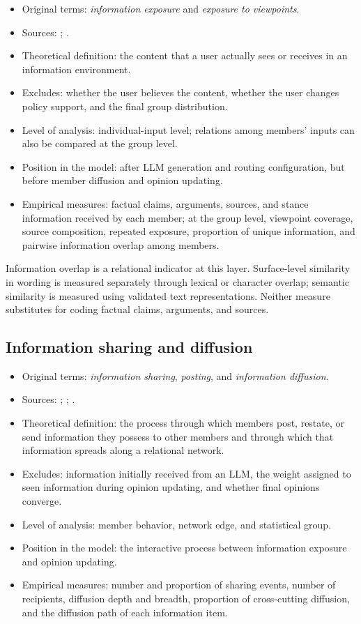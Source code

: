 \documentclass[11pt,a4paper]{article}
\newcommand{\term}[1]{\textit{#1}}
\begin{document}
\begin{itemize}
\item Original terms: \term{information exposure} and \term{exposure to viewpoints}.
\item Sources: \citet{nyhan2023}; \citet{perra2019}.
\item Theoretical definition: the content that a user actually sees or receives in an information environment.
\item Excludes: whether the user believes the content, whether the user changes policy support, and the final group distribution.
\item Level of analysis: individual-input level; relations among members' inputs can also be compared at the group level.
\item Position in the model: after LLM generation and routing configuration, but before member diffusion and opinion updating.
\item Empirical measures: factual claims, arguments, sources, and stance information received by each member; at the group level, viewpoint coverage, source composition, repeated exposure, proportion of unique information, and pairwise information overlap among members.
\end{itemize}

Information overlap is a relational indicator at this layer. Surface-level similarity in wording is measured separately through lexical or character overlap; semantic similarity is measured using validated text representations. Neither measure substitutes for coding factual claims, arguments, and sources.

\subsection{Information sharing and diffusion}

\begin{itemize}
\item Original terms: \term{information sharing}, \term{posting}, and \term{information diffusion}.
\item Sources: \citet{perra2019}; \citet{stasser1985}; \citet{steinel2010}.
\item Theoretical definition: the process through which members post, restate, or send information they possess to other members and through which that information spreads along a relational network.
\item Excludes: information initially received from an LLM, the weight assigned to seen information during opinion updating, and whether final opinions converge.
\item Level of analysis: member behavior, network edge, and statistical group.
\item Position in the model: the interactive process between information exposure and opinion updating.
\item Empirical measures: number and proportion of sharing events, number of recipients, diffusion depth and breadth, proportion of cross-cutting diffusion, and the diffusion path of each information item.
\end{itemize}
\end{document}
